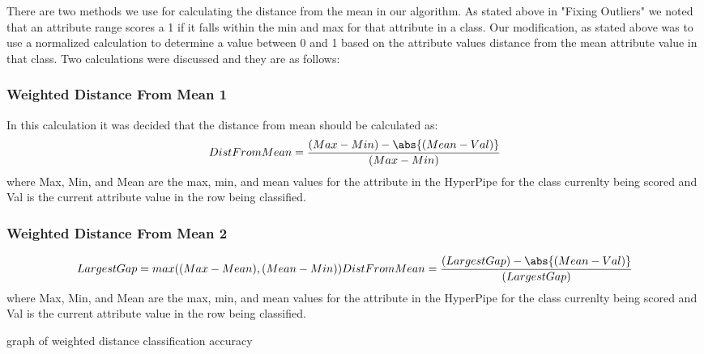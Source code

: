 There are two methods we use for calculating the distance from 
the mean in our algorithm. As stated above in "Fixing Outliers" 
we noted that an attribute range scores a 1 if it falls within 
the min and max for that attribute in a class. Our modification, 
as stated above was to use a normalized calculation to determine 
a value between 0 and 1 based on the attribute values distance 
from the mean attribute value in that class. Two calculations 
were discussed and they are as follows:
\subsubsection{Weighted Distance From Mean 1}
In this calculation it was decided that the distance from mean 
should be calculated as:
\begin{equation}
  DistFromMean=\frac{(Max-Min)-\abs{(Mean-Val)}}{(Max-Min)}
\end{equation}
where Max, Min, and Mean are the max, min, and mean values for 
the attribute in the HyperPipe for the class currenlty being 
scored and Val is the current attribute value in the row being 
classified.
\subsubsection{Weighted Distance From Mean 2}
\begin{equation}
  LargestGap = max((Max-Mean),(Mean-Min))
  DistFromMean=\frac{(LargestGap)-\abs{(Mean-Val)}}{(LargestGap)}
\end{equation}
where Max, Min, and Mean are the max, min, and mean values for 
the attribute in the HyperPipe for the class currenlty being 
scored and Val is the current attribute value in the row being 
classified.



graph of weighted distance classification accuracy

